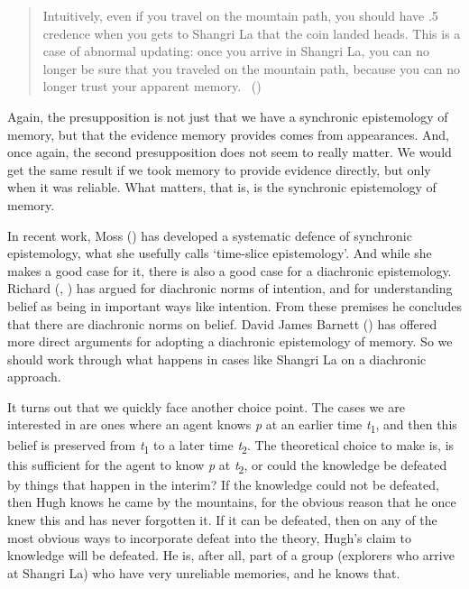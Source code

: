 \documentclass[
  10pt,
  letterpaper,
  twoside]{scrbook}
\begin{document}
\begin{quote}
Intuitively, even if you travel on the mountain path, you should have .5
credence when you gets to Shangri La that the coin landed heads. This is
a case of abnormal updating: once you arrive in Shangri La, you can no
longer be sure that you traveled on the mountain path, because you can
no longer trust your apparent memory. ~()
\end{quote}

Again, the presupposition is not just that we have a synchronic
epistemology of memory, but that the evidence memory provides comes from
appearances. And, once again, the second presupposition does not seem to
really matter. We would get the same result if we took memory to provide
evidence directly, but only when it was reliable. What matters, that is,
is the synchronic epistemology of memory.

In recent work, Moss () has developed a
systematic defence of synchronic epistemology, what she usefully calls
`time-slice epistemology'. And while she makes a good case for it, there
is also a good case for a diachronic epistemology. Richard
(,
) has argued for diachronic norms of
intention, and for understanding belief as being in important ways like
intention. From these premises he concludes that there are diachronic
norms on belief. David James Barnett ()
has offered more direct arguments for adopting a diachronic epistemology
of memory. So we should work through what happens in cases like Shangri
La on a diachronic approach.

It turns out that we quickly face another choice point. The cases we are
interested in are ones where an agent knows \emph{p} at an earlier time
\emph{t}\textsubscript{1}, and then this belief is preserved from
\emph{t}\textsubscript{1} to a later time \emph{t}\textsubscript{2}. The
theoretical choice to make is, is this sufficient for the agent to know
\emph{p} at \emph{t}\textsubscript{2}, or could the knowledge be
defeated by things that happen in the interim? If the knowledge could
not be defeated, then {Hugh} knows he came by the mountains, for the
obvious reason that he once knew this and has never forgotten it. If it
can be defeated, then on any of the most obvious ways to incorporate
defeat into the theory, {Hugh}'s claim to knowledge will be defeated. He
is, after all, part of a group (explorers who arrive at Shangri La) who
have very unreliable memories, and he knows that.
\end{document}
